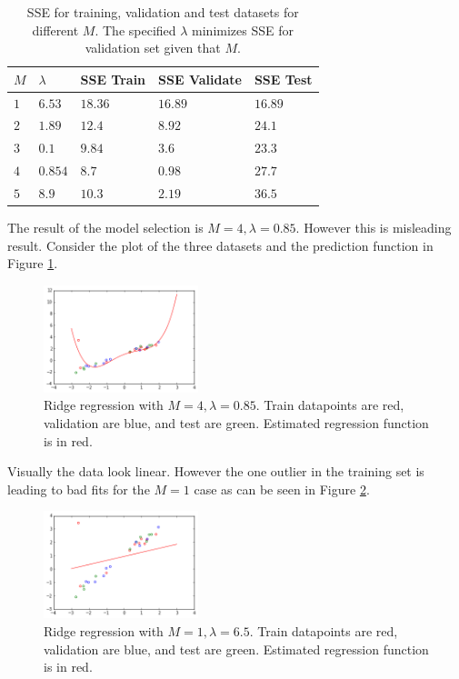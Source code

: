 \documentclass[10pt]{article}
\begin{document}
\begin{table}
\begin{tabular}{|l|l|l|l|l|}
\hline 
$M$ & $\lambda$ & SSE Train & SSE Validate & SSE Test \\ \hline
$1$ & $6.53$ & $18.36$ & $16.89$ & $16.89$ \\ \hline
$2$ & $1.89$ & $12.4$ & $8.92$ & $24.1$ \\ \hline
$3$ & $0.1$ & $9.84$ & $3.6$ & $23.3$ \\ \hline
$4$ & $0.854$ & $8.7$ & $0.98$ & $27.7$ \\ \hline
$5$ & $8.9$ & $10.3$ & $2.19$ & $36.5$ \\
\hline
\end{tabular}
\label{model-selection}
\caption{SSE for training, validation and test datasets for different $M$. The specified $\lambda$ minimizes SSE for validation set given that $M$.}
\end{table}
%
%
The result of the model selection is $M=4,\lambda=0.85$. However this is misleading result. Consider the plot of the three datasets and the prediction function in Figure \ref{m-4-model-selection}.
%
%
\begin{figure}[h]
\centering
\includegraphics[width=0.4\textwidth]{m-4-model-selection}
\caption{Ridge regression with $M = 4, \lambda = 0.85$. Train datapoints are red, validation are blue, and test are green. Estimated regression function is in red.}
\label{m-4-model-selection}
\end{figure}
%
%
Visually the data look linear. However the one outlier in the training set is leading to bad fits for the $M = 1$ case as can be seen in Figure \ref{m-1-model-selection}.
%
\begin{figure}[h]
\centering
\includegraphics[width=0.4\textwidth]{m-1-model-selection}
\caption{Ridge regression with $M = 1, \lambda = 6.5$. Train datapoints are red, validation are blue, and test are green. Estimated regression function is in red.}
\label{m-1-model-selection}
\end{figure}
\end{document}
